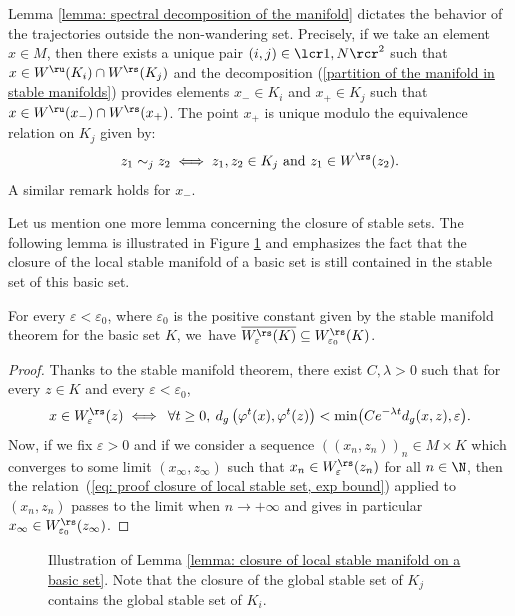Lemma \ref{lemma: spectral decomposition of the manifold} dictates the behavior of the trajectories outside the non-wandering set. Precisely, if we take an element $x \in M$, then there exists a unique pair $(i,j) \in \lcr1,N\rcr^2$ such that $x \in W^\ru (K_i) \cap W^\rs (K_j)$ and the decomposition (\ref{partition of the manifold in stable manifolds}) provides elements $x_- \in K_i$ and $x_+ \in K_j$ such that $x \in W^\ru (x_-) \cap W^\rs (x_+)$. The point $x_+$ is unique modulo the equivalence relation on $K_j$ given by:
\[
z_1 \sim_j z_2 \iff z_1, z_2 \in K_j \text{ and } z_1 \in W^\rs (z_2).
\]
A similar remark holds for $x_-$.

Let us mention one more lemma concerning the closure of stable sets. The following lemma is illustrated in Figure \ref{fig: closure of local stable manifold} and emphasizes the fact that the closure of the local stable manifold of a basic set is still contained in the stable set of this basic set.

\begin{lemma}\label{lemma: closure of local stable manifold on a basic set}
For every $\varepsilon < \varepsilon_0 $, where $\varepsilon_0$ is the positive constant given by the stable manifold theorem for the basic set $K$, we~have $\overline{W_{\varepsilon}^\rs (K)} \subseteq W_{\varepsilon_0}^\rs (K)$.
\end{lemma}

\begin{proof}
Thanks to the stable manifold theorem, there exist $C, \lambda > 0$ such that for every $z \in K$ and every $\varepsilon < \varepsilon_0$,
\begin{equation}\label{eq: proof closure of local stable set, exp bound}
x \in W_{\varepsilon}^\rs (z) \iff \: \forall t \geq 0, \: d_g \left(\varphi^t (x),\varphi^t (z) \right) < \min \bigl(C e^{-\lambda t} d_g (x,z), \varepsilon \bigr).
\end{equation}
Now, if we fix $\varepsilon > 0$ and if we consider a sequence $((x_n,z_n))_n \in M \times K$ which converges to some limit $(x_{\infty},z_{\infty})$ such that $x_n \in W_{\varepsilon}^\rs (z_n)$ for all $n \in \N$, then the relation~(\ref{eq: proof closure of local stable set, exp bound}) applied to $(x_n, z_n)$ passes to the limit when $n \to +\infty$ and gives in particular $x_{\infty} \in\nobreak W_{\varepsilon_0}^\rs (z_{\infty})$.
\end{proof}

\begin{figure}[!t]
\centering
\def\svgscale{0.6}

\caption{Illustration of Lemma \ref{lemma: closure of local stable manifold on a basic set}. Note that the closure of the global stable set of $K_j$ contains the global stable set of $K_i$.}
\label{fig: closure of local stable manifold}
\end{figure}

